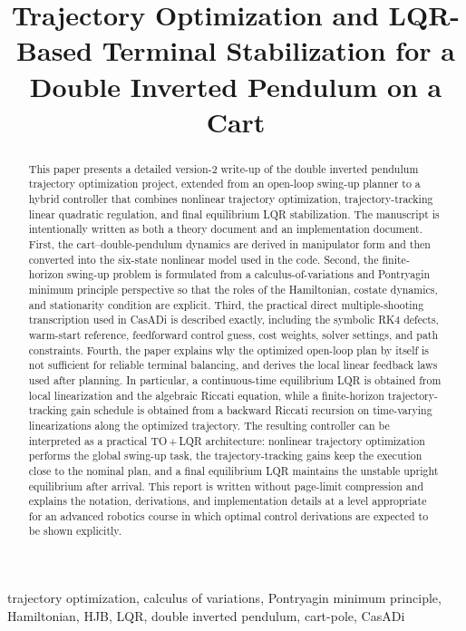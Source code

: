 \documentclass[conference]{IEEEtran}
\title{Trajectory Optimization and LQR-Based Terminal Stabilization for a Double Inverted Pendulum on a Cart}
\author{
\IEEEauthorblockN{Author Name}
\IEEEauthorblockA{Department of Mechanical and Aerospace Engineering\\
Advanced Robotics Course Project Report}
}
\begin{document}
\maketitle

\begin{abstract}
This paper presents a detailed version-2 write-up of the double inverted pendulum trajectory optimization project, extended from an open-loop swing-up planner to a hybrid controller that combines nonlinear trajectory optimization, trajectory-tracking linear quadratic regulation, and final equilibrium LQR stabilization. The manuscript is intentionally written as both a theory document and an implementation document. First, the cart--double-pendulum dynamics are derived in manipulator form and then converted into the six-state nonlinear model used in the code. Second, the finite-horizon swing-up problem is formulated from a calculus-of-variations and Pontryagin minimum principle perspective so that the roles of the Hamiltonian, costate dynamics, and stationarity condition are explicit. Third, the practical direct multiple-shooting transcription used in CasADi is described exactly, including the symbolic RK4 defects, warm-start reference, feedforward control guess, cost weights, solver settings, and path constraints. Fourth, the paper explains why the optimized open-loop plan by itself is not sufficient for reliable terminal balancing, and derives the local linear feedback laws used after planning. In particular, a continuous-time equilibrium LQR is obtained from local linearization and the algebraic Riccati equation, while a finite-horizon trajectory-tracking gain schedule is obtained from a backward Riccati recursion on time-varying linearizations along the optimized trajectory. The resulting controller can be interpreted as a practical TO\,+\,LQR architecture: nonlinear trajectory optimization performs the global swing-up task, the trajectory-tracking gains keep the execution close to the nominal plan, and a final equilibrium LQR maintains the unstable upright equilibrium after arrival. This report is written without page-limit compression and explains the notation, derivations, and implementation details at a level appropriate for an advanced robotics course in which optimal control derivations are expected to be shown explicitly.
\end{abstract}

\begin{IEEEkeywords}
trajectory optimization, calculus of variations, Pontryagin minimum principle, Hamiltonian, HJB, LQR, double inverted pendulum, cart-pole, CasADi
\end{IEEEkeywords}
\end{document}
